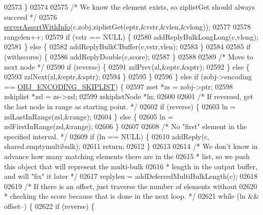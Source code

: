 \begin{DoxyCode}
02573             \}
02574 
02575             \textcolor{comment}{/* We know the element exists, so ziplistGet should always succeed */}
02576             \hyperlink{server_8h_a7308f76cbff9a8d3797fe78190b91282}{serverAssertWithInfo}(c,zobj,ziplistGet(eptr,&vstr,&vlen,&vlong));
02577 
02578             rangelen++;
02579             \textcolor{keywordflow}{if} (vstr == NULL) \{
02580                 addReplyBulkLongLong(c,vlong);
02581             \} \textcolor{keywordflow}{else} \{
02582                 addReplyBulkCBuffer(c,vstr,vlen);
02583             \}
02584 
02585             \textcolor{keywordflow}{if} (withscores) \{
02586                 addReplyDouble(c,score);
02587             \}
02588 
02589             \textcolor{comment}{/* Move to next node */}
02590             \textcolor{keywordflow}{if} (reverse) \{
02591                 zzlPrev(zl,&eptr,&sptr);
02592             \} \textcolor{keywordflow}{else} \{
02593                 zzlNext(zl,&eptr,&sptr);
02594             \}
02595         \}
02596     \} \textcolor{keywordflow}{else} \textcolor{keywordflow}{if} (zobj->encoding == \hyperlink{server_8h_acfb35db5cb30ed113ed23aeb1a224c4c}{OBJ\_ENCODING\_SKIPLIST}) \{
02597         zset *zs = zobj->ptr;
02598         zskiplist *zsl = zs->zsl;
02599         zskiplistNode *ln;
02600 
02601         \textcolor{comment}{/* If reversed, get the last node in range as starting point. */}
02602         \textcolor{keywordflow}{if} (reverse) \{
02603             ln = zslLastInRange(zsl,&range);
02604         \} \textcolor{keywordflow}{else} \{
02605             ln = zslFirstInRange(zsl,&range);
02606         \}
02607 
02608         \textcolor{comment}{/* No "first" element in the specified interval. */}
02609         \textcolor{keywordflow}{if} (ln == NULL) \{
02610             addReply(c, shared.emptymultibulk);
02611             \textcolor{keywordflow}{return};
02612         \}
02613 
02614         \textcolor{comment}{/* We don't know in advance how many matching elements there are in the}
02615 \textcolor{comment}{         * list, so we push this object that will represent the multi-bulk}
02616 \textcolor{comment}{         * length in the output buffer, and will "fix" it later */}
02617         replylen = addDeferredMultiBulkLength(c);
02618 
02619         \textcolor{comment}{/* If there is an offset, just traverse the number of elements without}
02620 \textcolor{comment}{         * checking the score because that is done in the next loop. */}
02621         \textcolor{keywordflow}{while} (ln && offset--) \{
02622             \textcolor{keywordflow}{if} (reverse) \{

\end{DoxyCode}
